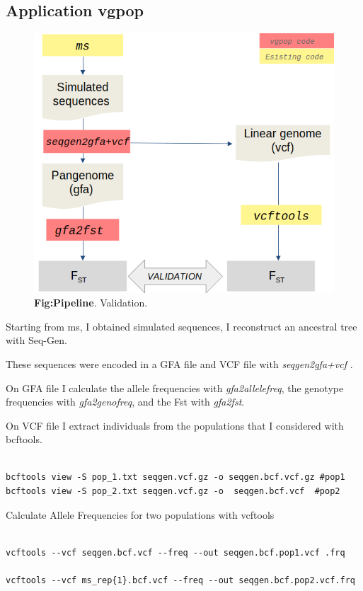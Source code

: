 \subsection{Application vgpop}
\begin{figure}[H]
\centering
\includegraphics[width=1.00\textwidth]{fig/pipeline_new.png}
\decoRule
\caption{\textbf{Fig:Pipeline}. 
Validation.}
\label{fig:pipeline.pdf}
\end{figure}

Starting from ms, I obtained simulated sequences, I reconstruct an ancestral tree with Seq-Gen. 

These sequences were encoded in a GFA file and VCF file with \textit{seqgen2gfa+vcf }.


On GFA file I calculate the allele frequencies with \textit{gfa2allelefreq}, the genotype frequencies with \textit{gfa2genofreq}, and the Fst with \textit{gfa2fst}. 

On VCF file I extract individuals from the populations that I considered with bcftools. %
\begin{verbatim}

bcftools view -S pop_1.txt seqgen.vcf.gz -o seqgen.bcf.vcf.gz #pop1
bcftools view -S pop_2.txt seqgen.vcf.gz -o  seqgen.bcf.vcf  #pop2 
\end{verbatim}

Calculate Allele Frequencies for two populations with vcftools
\begin{verbatim}

vcftools --vcf seqgen.bcf.vcf --freq --out seqgen.bcf.pop1.vcf .frq

vcftools --vcf ms_rep{1}.bcf.vcf --freq --out seqgen.bcf.pop2.vcf.frq 

\end{verbatim}

